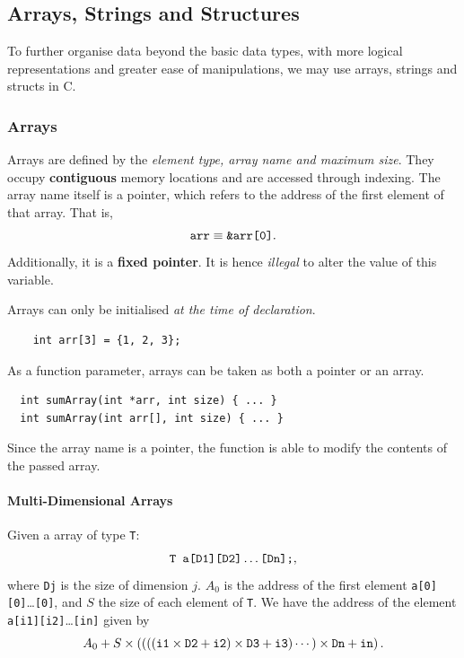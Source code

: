 \subsection{Arrays, Strings and Structures}
To further organise data beyond the basic data types, with more logical
representations and greater ease of manipulations, we may use arrays, strings
and structs in C.
\subsubsection{Arrays}
Arrays are defined by the \textit{element type, array name and maximum size}. They
occupy \textbf{contiguous} memory locations and are accessed through indexing.
The array name itself is a pointer, which refers to the address of the
first element of that array. That is,
\[\verb|arr|\equiv \verb|&arr[0]|.\] 
Additionally, it is a \textbf{fixed pointer}. It is hence \textit{illegal} to
alter the value of this variable.
\begin{remark}
  Arrays can only be initialised \textit{at the time of declaration}.
  \begin{lstlisting}
    int arr[3] = {1, 2, 3};
  \end{lstlisting}
\end{remark}
As a function parameter, arrays can be taken as both a pointer or an array.
\begin{lstlisting}
  int sumArray(int *arr, int size) { ... }
  int sumArray(int arr[], int size) { ... }
\end{lstlisting}
Since the array name is a pointer, the function is able to modify the contents
of the passed array.

\paragraph{Multi-Dimensional Arrays} Given a array of type \verb|T|:
\[\verb|T a[D1][D2]|\ldots\verb|[Dn];|,\] 
where \verb|Dj| is the size of dimension $j$. $A_0$ is the address of the first
element \verb|a[0][0]|\ldots\verb|[0]|, and $S$ the size of each element of \verb|T|. We have
the address of the element \verb|a[i1][i2]|\ldots\verb|[in]| given by
\[A_0+S\times \left( \left( \left( \left( \verb|i1|\times \verb|D2|+\verb|i2| \right) \times \verb|D3|+\verb|i3| \right)\cdots \right)\times \verb|Dn|+\verb|in| \right) .\] 

